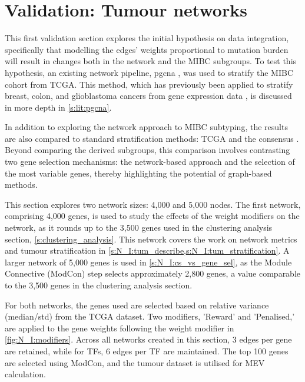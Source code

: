 \section{Validation: Tumour networks} \label{s:N_I:tum}

This first validation section explores the initial hypothesis on data integration, specifically that modelling the edges' weights proportional to mutation burden will result in changes both in the network and the MIBC subgroups. To test this hypothesis, an existing network pipeline, \acrfull{pgcna} \citep{Care2019-ij}, was used to stratify the MIBC cohort from TCGA. This method, which has previously been applied to stratify breast, colon, and glioblastoma cancers from gene expression data \citep{Care2019-ij,Tanner2023-wa}, is discussed in more depth in \cref{s:lit:pgcna}.

In addition to exploring the network approach to MIBC subtyping, the results are also compared to standard stratification methods: TCGA \citep{Robertson2017-mg} and the consensus \citep{Kamoun2020-tj}. Beyond comparing the derived subgroups, this comparison involves contrasting two gene selection mechanisms: the network-based approach and the selection of the most variable genes, thereby highlighting the potential of graph-based methods.

This section explores two network sizes: 4,000 and 5,000 nodes. The first network, comprising 4,000 genes, is used to study the effects of the weight modifiers on the network, as it rounds up to the 3,500 genes used in the clustering analysis section, \cref{s:clustering_analysis}. This network covers the work on network metrics and tumour stratification in \cref{s:N_I:tum_describe,s:N_I:tum_stratification}. A larger network of 5,000 genes is used in \cref{s:N_I:cs_vs_gene_sel}, as the Module Connective (ModCon) step selects approximately 2,800 genes, a value comparable to the 3,500 genes in the clustering analysis section.

For both networks, the genes used are selected based on relative variance (median/std) from the TCGA dataset. Two modifiers, 'Reward' and 'Penalised,' are applied to the gene weights following the weight modifier in \cref{fig:N_I:modifiers}. Across all networks created in this section, 3 edges per gene are retained, while for TFs, 6 edges per TF are maintained. The top 100 genes are selected using ModCon, and the tumour dataset is utilised for MEV calculation.

